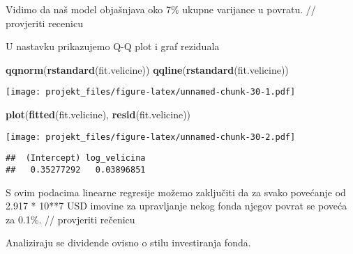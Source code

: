 \documentclass[
]{article}
\newenvironment{Shaded}{\begin{snugshade}}{\end{snugshade}}
\newcommand{\DecValTok}[1]{\textcolor[rgb]{0.00,0.00,0.81}{#1}}
\newcommand{\KeywordTok}[1]{\textcolor[rgb]{0.13,0.29,0.53}{\textbf{#1}}}
\newcommand{\NormalTok}[1]{#1}
\newcommand{\OperatorTok}[1]{\textcolor[rgb]{0.81,0.36,0.00}{\textbf{#1}}}
\newcommand{\StringTok}[1]{\textcolor[rgb]{0.31,0.60,0.02}{#1}}
\begin{document}
Vidimo da naš model objašnjava oko 7\% ukupne varijance u povratu. //
provjeriti recenicu

U nastavku prikazujemo Q-Q plot i graf reziduala

\begin{Shaded}
\begin{Highlighting}[]
\KeywordTok{qqnorm}\NormalTok{(}\KeywordTok{rstandard}\NormalTok{(fit.velicine))}
\KeywordTok{qqline}\NormalTok{(}\KeywordTok{rstandard}\NormalTok{(fit.velicine))}
\end{Highlighting}
\end{Shaded}

\texttt{[image: projekt\_files/figure-latex/unnamed-chunk-30-1.pdf]}

\begin{Shaded}
\begin{Highlighting}[]
\KeywordTok{plot}\NormalTok{(}\KeywordTok{fitted}\NormalTok{(fit.velicine), }\KeywordTok{resid}\NormalTok{(fit.velicine))}
\end{Highlighting}
\end{Shaded}

\texttt{[image: projekt\_files/figure-latex/unnamed-chunk-30-2.pdf]}

\begin{Shaded}
\end{Shaded}

\begin{verbatim}
##  (Intercept) log_velicina 
##   0.35277292   0.03896851
\end{verbatim}

S ovim podacima linearne regresije možemo zaključiti da za svako
povećanje od 2.917 * 10**7 USD imovine za upravljanje nekog fonda njegov
povrat se poveća za 0.1\%. // provjeriti rečenicu

Analiziraju se dividende ovisno o stilu investiranja fonda.
\end{document}
